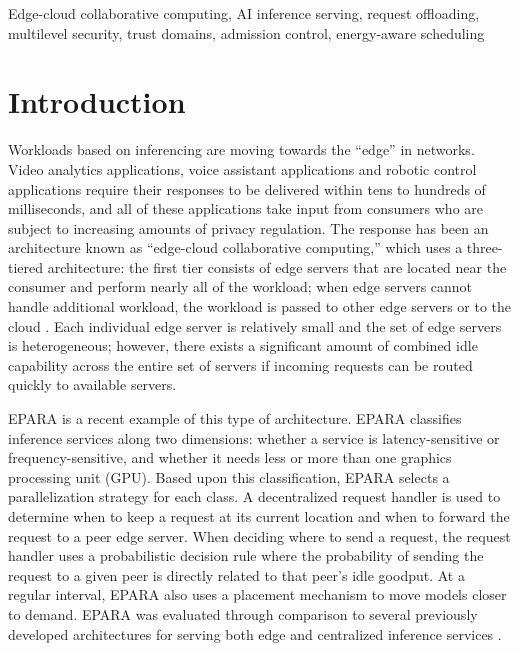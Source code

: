 \documentclass[journal]{IEEEtran}
\begin{document}
\begin{IEEEkeywords}
Edge-cloud collaborative computing, AI inference serving, request offloading, multilevel security, trust domains, admission control, energy-aware scheduling
\end{IEEEkeywords}

\section{Introduction}

Workloads based on inferencing are moving towards the ``edge'' in networks. Video analytics applications, voice assistant applications and robotic control applications require their responses to be delivered within tens to hundreds of milliseconds, and all of these applications take input from consumers who are subject to increasing amounts of privacy regulation. The response has been an architecture known as ``edge-cloud collaborative computing,'' which uses a three-tiered architecture: the first tier consists of edge servers that are located near the consumer and perform nearly all of the workload; when edge servers cannot handle additional workload, the workload is passed to other edge servers or to the cloud \cite{liu2025eccc}. Each individual edge server is relatively small and the set of edge servers is heterogeneous; however, there exists a significant amount of combined idle capability across the entire set of servers if incoming requests can be routed quickly to available servers.

EPARA \cite{epara2025} is a recent example of this type of architecture. EPARA classifies inference services along two dimensions: whether a service is latency-sensitive or frequency-sensitive, and whether it needs less or more than one graphics processing unit (GPU). Based upon this classification, EPARA selects a parallelization strategy for each class. A decentralized request handler is used to determine when to keep a request at its current location and when to forward the request to a peer edge server. When deciding where to send a request, the request handler uses a probabilistic decision rule where the probability of sending the request to a given peer is directly related to that peer's idle goodput. At a regular interval, EPARA also uses a placement mechanism to move models closer to demand. EPARA was evaluated through comparison to several previously developed architectures for serving both edge and centralized inference services \cite{epara2025}.
\end{document}
